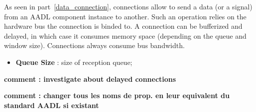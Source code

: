 As seen in part~\ref{data_connection}, connections allow to send a 
data (or a signal) from an AADL component instance to another. Such 
an operation relies on the hardware bus the connection is binded to.
A connection can be bufferized and delayed, in which case it consumes
memory space (depending on the queue and window size). Connections 
always consume bus bandwidth.

\begin{itemize}
\item \textbf{Queue Size} : size of reception queue;
\end{itemize}

\textbf{comment : investigate about delayed connections}


\textbf{comment : changer tous les noms de prop. en leur equivalent du standard AADL si existant}